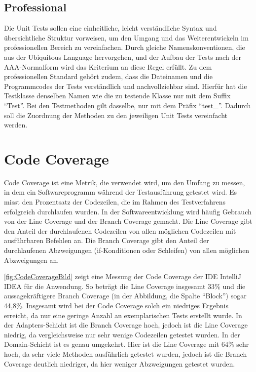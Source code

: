 \subsection{Professional}

Die Unit Tests sollen eine einheitliche, leicht verständliche Syntax und übersichtliche Struktur vorweisen, um den Umgang und das Weiterentwickeln im professionellen Bereich zu vereinfachen. Durch gleiche Namenskonventionen, die aus der Ubiquitous Language hervorgehen, und der Aufbau der Tests nach der AAA-Normalform wird das Kriterium an diese Regel erfüllt. Zu dem professionellen Standard gehört zudem, dass die Dateinamen und die Programmcodes der Tests verständlich und nachvollziehbar sind. Hierfür hat die Testklasse denselben Namen wie die zu testende Klasse nur mit dem Suffix \enquote{Test}. Bei den Testmethoden gilt dasselbe, nur mit dem Präfix \enquote{test\_}. Dadurch soll die Zuordnung der Methoden zu den jeweiligen Unit Tests vereinfacht werden. 


\section{Code Coverage}
\label{CodeCoverage}

Code Coverage ist eine Metrik, die verwendet wird, um den Umfang zu messen, in dem ein Softwareprogramm während der Testausführung getestet wird. Es misst den Prozentsatz der Codezeilen, die im Rahmen des Testverfahrens erfolgreich durchlaufen wurden.
In der Softwareentwicklung wird häufig Gebrauch von der Line Coverage und der Branch Coverage gemacht. Die Line Coverage gibt den Anteil der durchlaufenen Codezeilen von allen möglichen Codezeilen mit ausführbaren Befehlen an. Die Branch Coverage gibt den Anteil der durchlaufenen Abzweigungen (if-Konditionen oder Schleifen) von allen möglichen Abzweigungen an.

\autoref{fig:CodeCoverageBild} zeigt eine Messung der Code Coverage der IDE IntelliJ IDEA für die Anwendung. So beträgt die Line Coverage insgesamt 33\% und die aussagekräftigere Branch Coverage (in der Abbildung, die Spalte \enquote{Block}) sogar 44,8\%. Insgesamt wird bei der Code Coverage solch ein niedriges Ergebnis erreicht, da nur eine geringe Anzahl an exemplarischen Tests erstellt wurde. 
In der Adapters-Schicht ist die Branch Coverage hoch, jedoch ist die Line Coverage niedrig, da vergleichsweise nur sehr wenige Codezeilen getestet wurden. In der Domain-Schicht ist es genau umgekehrt. Hier ist die Line Coverage mit 64\% sehr hoch, da sehr viele Methoden ausführlich getestet wurden, jedoch ist die Branch Coverage deutlich niedriger, da hier weniger Abzweigungen getestet wurden. 

